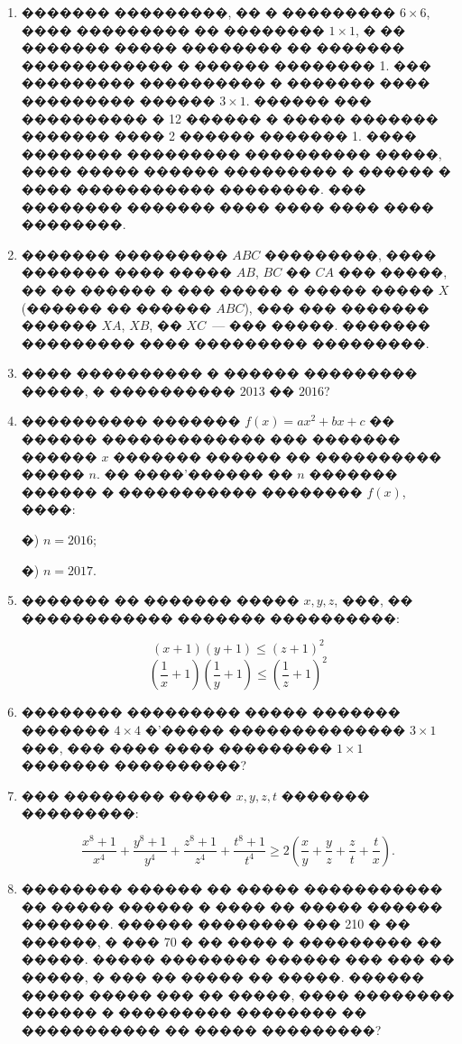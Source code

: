 \documentclass[a4paper,12pt]{article}
\begin{document}
\begin{enumerate}
\item ������� ���������, �� � ��������� $6\times 6$, ���� ��������� �� �������� $1\times 1$, � �� ������� ����� �������� �� ������� ������������ � ������ �������� 1. ��� ��������� ���������� � ������� ���� ��������� ������ $3\times 1$. ������ ��� ���������� � 12 ������ � ����� ������� ������� ���� 2 ������ ������� 1. ���� �������� ��������� ���������� �����, ���� ����� ������ ��������� � ������ � ���� ����������� ��������. ��� �������� ������� ���� ���� ���� ���� ��������.


\item ������� ��������� $ABC$ ���������, ���� ������� ���� ����� $AB$, $BC$ �� $CA$ ��� �����, �� �� ������ � ��� ����� � ����� ����� $X$ (������ �� ������ $ABC$), ��� ��� ������� ������ $XA$, $XB$, �� $XC$~--- ��� �����. ������� ��������� ���� ��������� ���������.

\item ���� ���������� � ������ ��������� �����, � ���������� $2013$ �� $2016$?

\item ���������� ������� $f(x)=ax^{2}+bx+c$ �� ������ ������������� ��� ������� ������ $x$ ������� ������ �� ���������� ����� $n$. �� ����'������ �� $n$ ������� ������ � ����������� �������� $f(x)$, ����:

�) $n=2016$;

�) $n=2017$.

\item ������� �� ������� ����� $x,y,z$, ���, �� ������������ ������� ����������:

\begin{flushleft}
$$(x+1)(y+1)\leq (z+1)^{2}$$
$$(\frac{1}{x}+1)(\frac{1}{y}+1)\leq (\frac{1}{z}+1)^{2}$$
\end{flushleft}

\item �������� ��������� ����� ������� ������� $4\times 4$ �'����� �������������� $3\times 1$ ���, ��� ���� ���� ��������� $1\times 1$ ������� ����������?

\item ��� �������� ����� $x,y,z,t$ ������� ���������:

$$\frac{x^{8}+1}{x^{4}}+\frac{y^{8}+1}{y^{4}}+\frac{z^{8}+1}{z^{4}}+\frac{t^{8}+1}{t^{4}} \geq 2(\frac{x}{y}+\frac{y}{z}+\frac{z}{t}+\frac{t}{x}).$$



\item �������� ������ �� ����� ����������� �� ����� ������ � ���� �� ����� ������ �������. ������ �������� ��� 210 � �� ������, � ��� 70 � �� ���� � ��������� �� �����. ����� �������� ������ ��� ��� �� �����, � ��� �� ����� �� �����. ������ ����� ����� ��� �� �����, ���� �������� ������ � ��������� �������� �� ����������� �� ����� ���������?


\end{enumerate}
\end{document}
